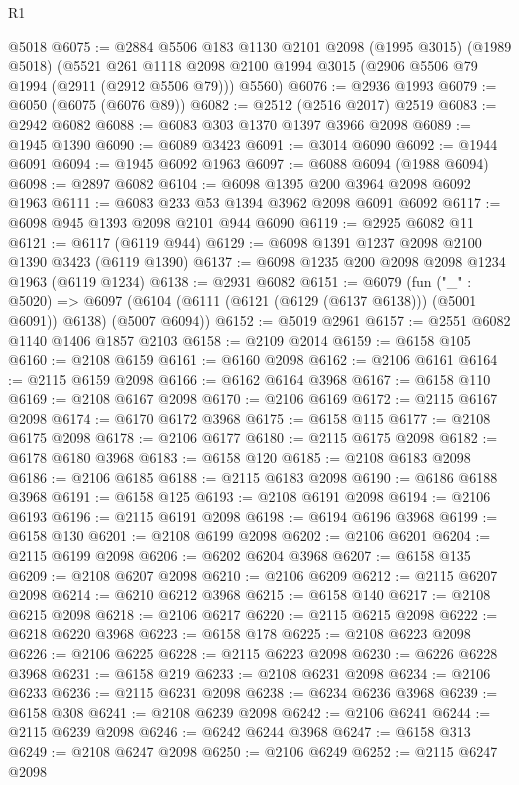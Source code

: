 \begin{lexlean}{R1}
\begin{coremodule}
    @5018
@6075 := @2884
    @5506
    @183
    @1130
    @2101
    @2098
    (@1995 @3015)
    (@1989 @5018)
    (@5521
      @261
      @1118
      @2098
      @2100
      @1994
      @3015
      (@2906 @5506 @79 @1994 (@2911 (@2912 @5506 @79)))
      @5560)
@6076 := @2936 @1993
@6079 := @6050 (@6075 (@6076 @89))
@6082 := @2512 (@2516 @2017) @2519
@6083 := @2942 @6082
@6088 := @6083 @303 @1370 @1397 @3966 @2098
@6089 := @1945 @1390
@6090 := @6089 @3423
@6091 := @3014 @6090
@6092 := @1944 @6091
@6094 := @1945 @6092 @1963
@6097 := @6088 @6094 (@1988 @6094)
@6098 := @2897 @6082
@6104 := @6098 @1395 @200 @3964 @2098 @6092 @1963
@6111 := @6083 @233 @53 @1394 @3962 @2098 @6091 @6092
@6117 := @6098 @945 @1393 @2098 @2101 @944 @6090
@6119 := @2925 @6082 @11
@6121 := @6117 (@6119 @944)
@6129 := @6098 @1391 @1237 @2098 @2100 @1390 @3423 (@6119 @1390)
@6137 := @6098 @1235 @200 @2098 @2098 @1234 @1963 (@6119 @1234)
@6138 := @2931 @6082
@6151 := @6079
    (fun ("_" : @5020) =>
    @6097 (@6104 (@6111 (@6121 (@6129 (@6137 @6138))) (@5001 @6091)) @6138) (@5007 @6094))
@6152 := @5019 @2961
@6157 := @2551 @6082 @1140 @1406 @1857 @2103
@6158 := @2109 @2014
@6159 := @6158 @105
@6160 := @2108 @6159
@6161 := @6160 @2098
@6162 := @2106 @6161
@6164 := @2115 @6159 @2098
@6166 := @6162 @6164 @3968
@6167 := @6158 @110
@6169 := @2108 @6167 @2098
@6170 := @2106 @6169
@6172 := @2115 @6167 @2098
@6174 := @6170 @6172 @3968
@6175 := @6158 @115
@6177 := @2108 @6175 @2098
@6178 := @2106 @6177
@6180 := @2115 @6175 @2098
@6182 := @6178 @6180 @3968
@6183 := @6158 @120
@6185 := @2108 @6183 @2098
@6186 := @2106 @6185
@6188 := @2115 @6183 @2098
@6190 := @6186 @6188 @3968
@6191 := @6158 @125
@6193 := @2108 @6191 @2098
@6194 := @2106 @6193
@6196 := @2115 @6191 @2098
@6198 := @6194 @6196 @3968
@6199 := @6158 @130
@6201 := @2108 @6199 @2098
@6202 := @2106 @6201
@6204 := @2115 @6199 @2098
@6206 := @6202 @6204 @3968
@6207 := @6158 @135
@6209 := @2108 @6207 @2098
@6210 := @2106 @6209
@6212 := @2115 @6207 @2098
@6214 := @6210 @6212 @3968
@6215 := @6158 @140
@6217 := @2108 @6215 @2098
@6218 := @2106 @6217
@6220 := @2115 @6215 @2098
@6222 := @6218 @6220 @3968
@6223 := @6158 @178
@6225 := @2108 @6223 @2098
@6226 := @2106 @6225
@6228 := @2115 @6223 @2098
@6230 := @6226 @6228 @3968
@6231 := @6158 @219
@6233 := @2108 @6231 @2098
@6234 := @2106 @6233
@6236 := @2115 @6231 @2098
@6238 := @6234 @6236 @3968
@6239 := @6158 @308
@6241 := @2108 @6239 @2098
@6242 := @2106 @6241
@6244 := @2115 @6239 @2098
@6246 := @6242 @6244 @3968
@6247 := @6158 @313
@6249 := @2108 @6247 @2098
@6250 := @2106 @6249
@6252 := @2115 @6247 @2098

\end{coremodule}
\end{lexlean}
